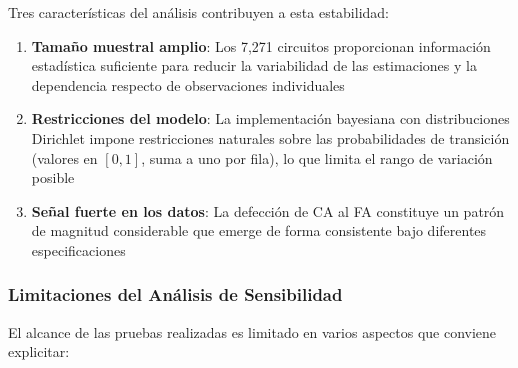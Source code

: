 Tres características del análisis contribuyen a esta estabilidad:

\begin{enumerate}
    \item \textbf{Tamaño muestral amplio}: Los 7,271 circuitos proporcionan información estadística suficiente para reducir la variabilidad de las estimaciones y la dependencia respecto de observaciones individuales

    \item \textbf{Restricciones del modelo}: La implementación bayesiana con distribuciones Dirichlet impone restricciones naturales sobre las probabilidades de transición (valores en $[0,1]$, suma a uno por fila), lo que limita el rango de variación posible

    \item \textbf{Señal fuerte en los datos}: La defección de CA al FA constituye un patrón de magnitud considerable que emerge de forma consistente bajo diferentes especificaciones
\end{enumerate}

\subsubsection{Limitaciones del Análisis de Sensibilidad}

El alcance de las pruebas realizadas es limitado en varios aspectos que conviene explicitar:

